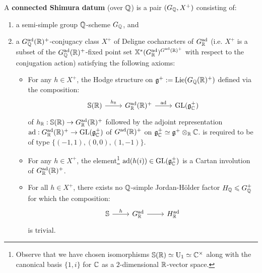             \begin{definition} \label{def: connected_shimura_data}
                A \textbf{connected Shimura datum} (over $\mathbb{Q}$) is a pair $(G_{\mathbb{Q}}, X^+)$ consisting of:
                    \begin{enumerate}
                        \item a semi-simple group $\mathbb{Q}$-scheme $G_{\mathbb{Q}}$, and
                        \item a $G^{\mathrm{ad}}_{\mathbb{Q}}(\mathbb{R})^+$-conjugacy class $X^+$ of Deligne cocharacters of $G^{\mathrm{ad}}_{\mathbb{R}}$ (i.e. $X^+$ is a subset of the $G_{\mathbb{Q}}^{\mathrm{ad}}(\mathbb{R})^+$-fixed point set $\mathbb{X}^*(G^{\mathrm{ad}}_{\mathbb{R}})^{G^{\mathrm{ad}}(\mathbb{R})^+}$ with respect to the conjugation action) satisfying the following axioms:
                            \begin{itemize}
                                \item For any $h \in X^+$, the Hodge structure on $\mathfrak{g}^+ := \mathrm{Lie}(G_{\mathbb{Q}}(\mathbb{R})^+)$ defined via the composition:
                                    $$
                                        \begin{tikzcd}
                                        	\bbS(\R) & {G^{\ad}_{\R}(\R)^+} & {\GL(\g^+_{\bbC})}
                                        	\arrow["h_{\R}", from=1-1, to=1-2]
                                        	\arrow["\ad", from=1-2, to=1-3]
                                        \end{tikzcd}
                                    $$
                                of $h_{\mathbb{R}}: \mathbb{S}(\mathbb{R}) \to G^{\mathrm{ad}}_{\mathbb{R}}(\mathbb{R})^+$ followed by the adjoint representation $\mathrm{ad}: G^{\mathrm{ad}}_{\mathbb{R}}(\mathbb{R})^+ \to \operatorname{GL}(\mathfrak{g}^+_{\mathbb{C}})$ of $G^{\mathrm{ad}}(\mathbb{R})^+$ on $\g^+_{\bbC} \cong \g^+ \tensor_{\R} \bbC$.
                                is required to be of type $\{(-1, 1), (0, 0), (1, -1)\}$.
                                \item For any $h \in X^+$, the element\footnote{Observe that we have chosen isomorphisms $\bbS(\R) \cong \U_1 \cong \bbC^{\x}$ along with the canonical basis $\{1, i\}$ for $\mathbb{C}$ as a $2$-dimensional $\mathbb{R}$-vector space.} $\mathrm{ad}(h(i)) \in \operatorname{GL}(\mathfrak{g}^+_{\mathbb{C}})$ is a Cartan involution of $G^{\mathrm{ad}}_{\mathbb{R}}(\mathbb{R})^+$.
                                \item For all $h \in X^+$, there exists no $\mathbb{Q}$-simple Jordan-H\"older factor $H_{\mathbb{Q}} \leqslant G_{\mathbb{Q}}^+$ for which the composition:
                                    $$
                                        \begin{tikzcd}
                                        	\bbS & {G^{\ad}_{\R}} & {H^{\ad}_{\R}}
                                        	\arrow["h", from=1-1, to=1-2]
                                        	\arrow["", from=1-2, to=1-3]
                                        \end{tikzcd}
                                    $$
                                is trivial.
                            \end{itemize}
                    \end{enumerate}
            \end{definition}
